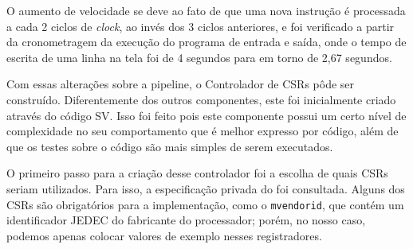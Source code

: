 \documentclass[
	12pt,				%
	openright,			%
	oneside,			%
	a4paper,			%
	english,			%
	french,				%
	spanish,			%
	brazil,				%
	]{abntex2}
\begin{document}
O aumento de velocidade se deve ao fato de que uma nova instrução é processada a cada 2 ciclos de \textit{clock}, ao invés dos 3 ciclos anteriores, e foi verificado a partir da cronometragem da execução do programa de entrada e saída, onde o tempo de escrita de uma linha na tela foi de 4 segundos para em torno de 2,67 segundos.

Com essas alterações sobre a pipeline, o Controlador de CSRs pôde ser construído. Diferentemente dos outros componentes, este foi inicialmente criado através do código SV. Isso foi feito pois este componente possui um certo nível de complexidade no seu comportamento que é melhor expresso por código, além de que os testes sobre o código são mais simples de serem executados.

O primeiro passo para a criação desse controlador foi a escolha de quais CSRs seriam utilizados. Para isso, a especificação privada do  foi consultada. Alguns dos CSRs são obrigatórios para a implementação, como o \texttt{mvendorid}, que contém um identificador JEDEC do fabricante do processador; porém, no nosso caso, podemos apenas colocar valores de exemplo nesses registradores. 
\end{document}
